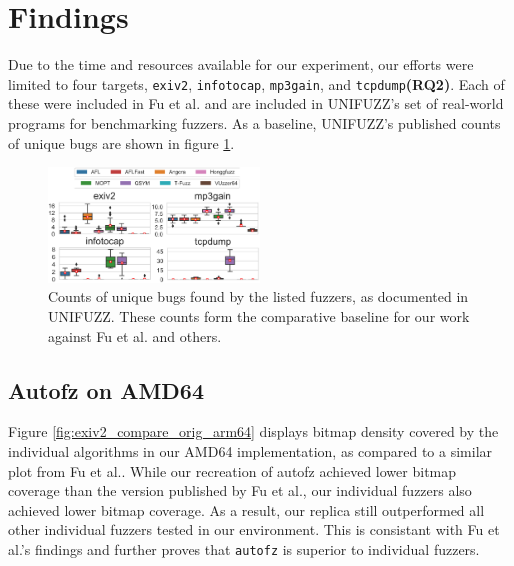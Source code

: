 \section{Findings}

Due to the time and resources available for our experiment, our efforts were limited 
to four targets, \texttt{exiv2}, \texttt{infotocap}, \texttt{mp3gain}, and 
\texttt{tcpdump}\textbf{(RQ2)}. Each of these were included in Fu et al.\cite{fu_autofz_2023} 
and are included in UNIFUZZ's\cite{li_unifuzz_2021} set of real-world programs for 
benchmarking fuzzers. As a baseline, UNIFUZZ's published counts of unique bugs are 
shown in figure \ref{fig:unifuzz_selections}.

\begin{figure}[h!]
    \includegraphics[width=0.5\textwidth]{figs/unifuzz_selections.png}
    \centering
    \caption{Counts of unique bugs found by the listed fuzzers, as documented in 
    UNIFUZZ\cite{li_unifuzz_2021}. These counts form the comparative baseline for 
    our work against Fu et al.\cite{fu_autofz_2023} and others.}
    \label{fig:unifuzz_selections}
\end{figure}

\subsection{Autofz on AMD64}

Figure \ref{fig:exiv2_compare_orig_arm64} displays bitmap density covered by the individual algorithms in our AMD64 implementation, 
as compared to a similar plot from Fu et al.\cite{fu_autofz_2023}. While our recreation of autofz achieved lower bitmap coverage than 
the version published by Fu et al., our individual fuzzers also achieved lower bitmap coverage. As a result, our replica still 
outperformed all other individual fuzzers tested in our environment. This is consistant
with Fu et al.'s findings and further proves that \texttt{autofz} is superior to individual fuzzers.

